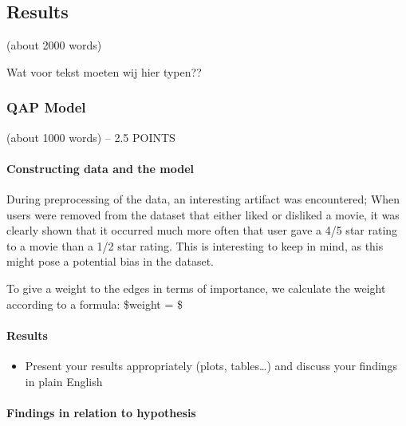 \documentclass[
  man]{apa6}
\providecommand{\tightlist}{%
  \setlength{\itemsep}{0pt}\setlength{\parskip}{0pt}}
\begin{document}
\hypertarget{results}{%
\subsection{Results}\label{results}}

(about 2000 words)

Wat voor tekst moeten wij hier typen??

\hypertarget{qap-model}{%
\subsubsection{QAP Model}\label{qap-model}}

(about 1000 words) -- 2.5 POINTS

\hypertarget{constructing-data-and-the-model}{%
\paragraph{Constructing data and the
model}\label{constructing-data-and-the-model}}

During preprocessing of the data, an interesting artifact was
encountered; When users were removed from the dataset that either liked
or disliked a movie, it was clearly shown that it occurred much more
often that user gave a 4/5 star rating to a movie than a 1/2 star
rating. This is interesting to keep in mind, as this might pose a
potential bias in the dataset.

To give a weight to the edges in terms of importance, we calculate the
weight according to a formula: \$weight =
 \$

\hypertarget{results-1}{%
\paragraph{Results}\label{results-1}}

\begin{itemize}
\tightlist
\item
  Present your results appropriately (plots, tables\ldots) and discuss
  your findings in plain English
\end{itemize}

\hypertarget{findings-in-relation-to-hypothesis}{%
\paragraph{Findings in relation to
hypothesis}\label{findings-in-relation-to-hypothesis}}
\end{document}
